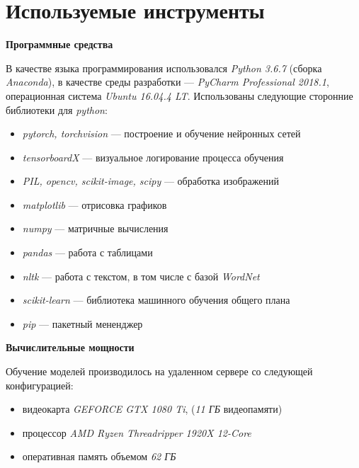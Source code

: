\section{Используемые инструменты}

\textbf{Программные средства}

\indent
В качестве языка программирования использовался
 \textit{Python 3.6.7} (сборка \textit{Anaconda}),
 в качестве среды разработки --- \textit{PyCharm Professional 2018.1},
 операционная система \textit{Ubuntu 16.04.4 LT}. Использованы
 следующие сторонние библиотеки для \textit{python}:

\begin{itemize}
    \item \textit{pytorch, torchvision} --- построение и обучение нейронных сетей
    \item \textit{tensorboardX} --- визуальное логирование процесса обучения 
    \item \textit{PIL, opencv, scikit-image, scipy} --- обработка изображений
    \item \textit{matplotlib} --- отрисовка графиков
    \item \textit{numpy} --- матричные вычисления
    \item \textit{pandas} --- работа с таблицами
    \item \textit{nltk} --- работа с текстом, в том числе с базой \textit{WordNet}
    \item \textit{scikit-learn} --- библиотека машинного обучения общего плана
   \item \textit{pip} --- пакетный мененджер
\end{itemize}


\bigskip


\textbf{Вычислительные мощности}

\indent
\indent
Обучение моделей производилось на удаленном сервере со следующей конфигурацией:
\begin{itemize}
    \item видеокарта \textit{GEFORCE GTX 1080 Ti}, (\textit{11 ГБ} видеопамяти)
    \item процессор \textit{AMD Ryzen Threadripper 1920X 12-Core}
    \item оперативная память объемом  \textit{62 ГБ}
\end{itemize}
